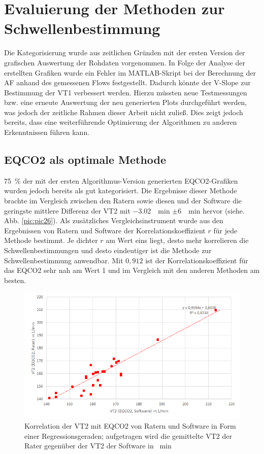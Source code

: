 \section{Evaluierung der Methoden zur Schwellenbestimmung}
%
Die Kategorisierung wurde aus zeitlichen Gründen mit der ersten Version der grafischen Auswertung der Rohdaten vorgenommen. In Folge der Analyse der erstellten Grafiken wurde ein Fehler im MATLAB-Skript bei der Berechnung der \acs{AF} anhand des gemessenen Flows festgestellt. Dadurch könnte der V-Slope zur Bestimmung der VT1 verbessert werden. Hierzu müssten neue Testmessungen bzw. eine erneute Auswertung der neu generierten Plots durchgeführt werden, was jedoch der zeitliche Rahmen dieser Arbeit nicht zuließ. Dies zeigt jedoch bereits, dass eine weiterführende Optimierung der Algorithmen zu anderen Erkenntnissen führen kann.
%
\subsection{\acs{EQCO2} als optimale Methode}
%
75~\% der mit der ersten Algorithmus-Version generierten \acs{EQCO2}-Grafiken wurden jedoch bereits als gut kategorisiert. Die Ergebnisse dieser Methode brachte im Vergleich zwischen den Ratern sowie diesen und der Software die geringste mittlere Differenz der VT2 mit \SI{-3,02}{\per\minute} $\pm$\SI{6}{\per\minute} hervor (siehe. Abb. \ref{pic:pic26}). Als zusätzliches Vergleichsinstrument wurde aus den Ergebnissen von Ratern und Software der Korrelationskoeffizient $r$ für jede Methode bestimmt. Je dichter $r$ am Wert eins liegt, desto mehr korrelieren die Schwellenbestimmungen und desto eindeutiger ist die Methode zur Schwellenbestimmung anwendbar. Mit $0,912$ ist der Korrelationskoeffizient für das \acs{EQCO2} sehr nah am Wert 1 und im Vergleich mit den anderen Methoden am besten.
%
\begin{figure}[H]
	\centering
	\includegraphics[scale=0.7]{Bilder/r_eqco2}
	\caption[Korrelation der \acs{EQCO2}-Werte von Ratern und Software]{Korrelation der VT2 mit \acs{EQCO2} von Ratern und Software in Form einer Regressionsgeraden; aufgetragen wird die gemittelte VT2 der Rater gegenüber der VT2 der Software in \si{\per\minute}}
	\label{pic:pic28}
\end{figure}
